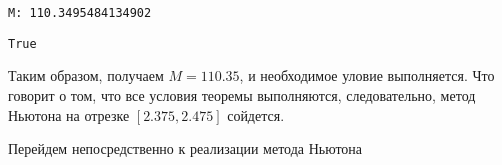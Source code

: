 \documentclass[11pt]{article}
\makeatletter
\newcommand{\boxspacing}{\kern\kvtcb@left@rule\kern\kvtcb@boxsep}
\newcommand{\prompt}[4]{
        {\ttfamily\llap{{\color{#2}[#3]:\hspace{3pt}#4}}\vspace{-\baselineskip}}
    }
\makeatother
\begin{document}
    \begin{Verbatim}[commandchars=\\\{\}]
M: 110.3495484134902
    \end{Verbatim}

            \begin{tcolorbox}[breakable, size=fbox, boxrule=.5pt, pad at break*=1mm, opacityfill=0]
\prompt{Out}{outcolor}{103}{\boxspacing}
\begin{Verbatim}[commandchars=\\\{\}]
True
\end{Verbatim}
\end{tcolorbox}
        
    Таким образом, получаем \(M = 110.35\), и необходимое уловие
выполняется. Что говорит о том, что все условия теоремы выполняются,
следовательно, метод Ньютона на отрезке \([2.375, 2.475]\) сойдется.

Перейдем непосредственно к реализации метода Ньютона
\end{document}
